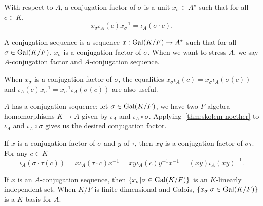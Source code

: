 \begin{definition}
  \label{def:conj-factor}
  With respect to $A$, a conjugation factor of $\sigma$ is a unit $x_{\sigma} \in A^{\star}$ such that for all $c \in K$,
  \[
    x_{\sigma} \iota_{A}(c)x_{\sigma}^{-1} = \iota_{A}(\sigma \cdot c).
  \]

  A conjugation sequence is a sequence $x:\operatorname{Gal}(K/F) \to A^{\star}$ such that for all $\sigma\in\operatorname{Gal}(K/F)$, $x_{\sigma}$ is a conjugation factor of $\sigma$. When we want to stress $A$, we say $A$-conjugation factor and $A$-conjugation sequence.
  \leanok
\end{definition}

\begin{remark}\label{rem:conj-factor-alternative-eq}
  When $x_{\sigma}$ is a conjugation factor of $\sigma$, the equalities $x_{\sigma}\iota_{A}(c) = x_{\sigma}\iota_{A}(\sigma(c))$ and $\iota_{A}(c)x_{\sigma}^{-1}=x_{\sigma}^{-1}\iota_{A}(\sigma(c))$ are also useful.
\end{remark}

\begin{construction}\label{con:exists-conj-seq}
  $A$ has a conjugation sequence:
  let $\sigma \in \operatorname{Gal}(K/F)$, we have two $F$-algebra homomorphisms $K \to A$ given by $\iota_{A}$ and $\iota_{A}\circ \sigma$. Applying~\cref{thm:skolem-noether} to $\iota_{A}$ and $\iota_{A}\circ \sigma$ gives us the desired conjugation factor.
  \leanok
\end{construction}

\begin{construction}
  If $x$ is a conjugation factor of $\sigma$ and $y$ of $\tau$, then $xy$ is a conjugation factor of $\sigma\tau$. For any $c \in K$
  \[
    \iota_{A}(\sigma \cdot\tau(c)) = x\iota_{A}(\tau\cdot c)x^{-1} = xy\iota_{A}(c)y^{-1}x^{-1}=\left(xy\right)\iota_{A}{\left(xy\right)}^{-1}.
  \]
  \leanok
\end{construction}

\begin{theorem}
  If $x$ is an $A$-conjugation sequence, then $\{x_{\sigma}|\sigma\in \operatorname{Gal}(K/F)\}$ is an $K$-linearly independent set. When $K/F$ is finite dimensional and Galois, $\{x_{\sigma}|\sigma\in \operatorname{Gal}(K/F)\}$ is a $K$-basis for $A$.
  \leanok
\end{theorem}

